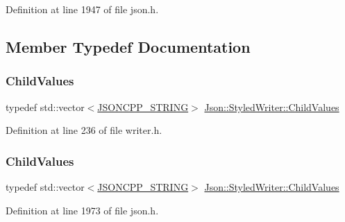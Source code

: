 Definition at line 1947 of file json.\+h.



\subsection{Member Typedef Documentation}
\hypertarget{class_json_1_1_styled_writer_a798fcefa41730de612a5cf7e73003e8a}{}\label{class_json_1_1_styled_writer_a798fcefa41730de612a5cf7e73003e8a} 
\subsubsection{\texorpdfstring{Child\+Values}{ChildValues}\hspace{0.1cm}{\footnotesize\ttfamily [1/2]}}
{\footnotesize\ttfamily typedef std\+::vector$<$\hyperlink{config_8h_a1e723f95759de062585bc4a8fd3fa4be}{J\+S\+O\+N\+C\+P\+P\+\_\+\+S\+T\+R\+I\+NG}$>$ \hyperlink{class_json_1_1_styled_writer_a798fcefa41730de612a5cf7e73003e8a}{Json\+::\+Styled\+Writer\+::\+Child\+Values}\hspace{0.3cm}{\ttfamily [private]}}



Definition at line 236 of file writer.\+h.

\hypertarget{class_json_1_1_styled_writer_a798fcefa41730de612a5cf7e73003e8a}{}\label{class_json_1_1_styled_writer_a798fcefa41730de612a5cf7e73003e8a} 
\subsubsection{\texorpdfstring{Child\+Values}{ChildValues}\hspace{0.1cm}{\footnotesize\ttfamily [2/2]}}
{\footnotesize\ttfamily typedef std\+::vector$<$\hyperlink{config_8h_a1e723f95759de062585bc4a8fd3fa4be}{J\+S\+O\+N\+C\+P\+P\+\_\+\+S\+T\+R\+I\+NG}$>$ \hyperlink{class_json_1_1_styled_writer_a798fcefa41730de612a5cf7e73003e8a}{Json\+::\+Styled\+Writer\+::\+Child\+Values}\hspace{0.3cm}{\ttfamily [private]}}



Definition at line 1973 of file json.\+h.



